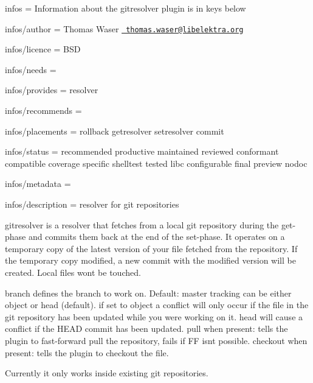 
\begin{DoxyItemize}
\item infos = Information about the gitresolver plugin is in keys below
\item infos/author = Thomas Waser \href{mailto:thomas.waser@libelektra.org}{\texttt{ thomas.\+waser@libelektra.\+org}}
\item infos/licence = B\+SD
\item infos/needs =
\item infos/provides = resolver
\item infos/recommends =
\item infos/placements = rollback getresolver setresolver commit
\item infos/status = recommended productive maintained reviewed conformant compatible coverage specific shelltest tested libc configurable final preview nodoc
\item infos/metadata =
\item infos/description = resolver for git repositories
\end{DoxyItemize}

gitresolver is a resolver that fetches from a local git repository during the get-\/phase and commits them back at the end of the set-\/phase. It operates on a temporary copy of the latest version of your file fetched from the repository. If the temporary copy modified, a new commit with the modified version will be created. Local files won\textquotesingle{}t be touched.

{\ttfamily branch} defines the branch to work on. Default\+: master {\ttfamily tracking} can be either {\ttfamily object} or {\ttfamily head} (default). if set to {\ttfamily object} a conflict will only occur if the file in the git repository has been updated while you were working on it. {\ttfamily head} will cause a conflict if the {\ttfamily H\+E\+AD} commit has been updated. {\ttfamily pull} when present\+: tells the plugin to fast-\/forward pull the repository, fails if FF isn\textquotesingle{}t possible. {\ttfamily checkout} when present\+: tells the plugin to checkout the file.

Currently it only works inside existing git repositories.


\begin{DoxyCode}{0}
\end{DoxyCode}
 